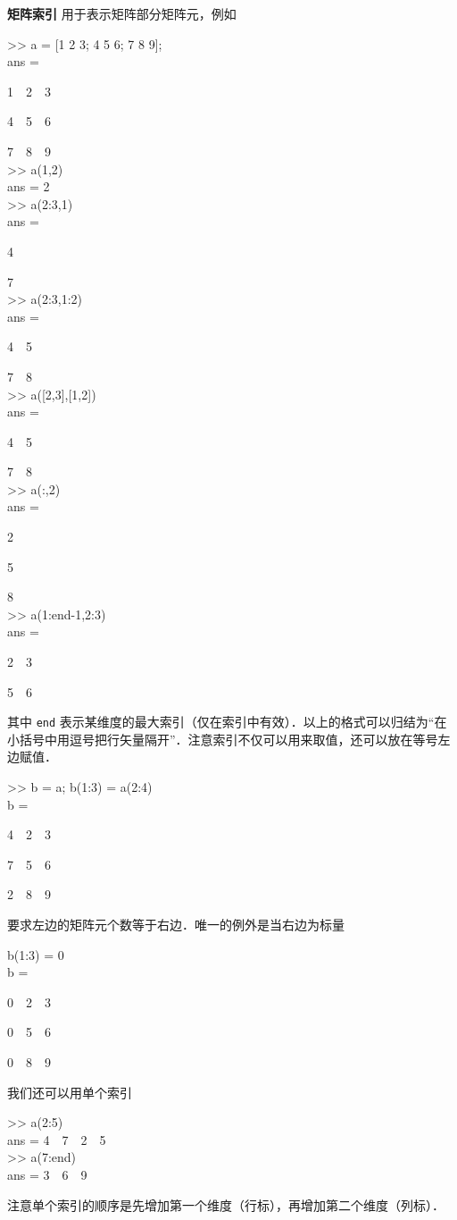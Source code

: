 \textbf{矩阵索引} 用于表示矩阵部分矩阵元，例如
\begin{Command}
>> a = [1 2 3; 4 5 6; 7 8 9]; \\
ans = \par
1\ \ 2\ \ 3 \par
4\ \ 5\ \ 6 \par
7\ \ 8\ \ 9 \\
>> a(1,2) \\
ans = 2 \\
>> a(2:3,1) \\
ans = \par
4 \par
7 \\
>> a(2:3,1:2) \\
ans = \par
4\ \ 5 \par
7\ \ 8 \\
>> a([2,3],[1,2]) \\
ans = \par
4\ \ 5 \par
7\ \ 8 \\
>> a(:,2) \\
ans = \par
2 \par
5 \par
8 \\
>> a(1:end-1,2:3) \\
ans = \par
2\ \ 3 \par
5\ \ 6
\end{Command}
其中 \texttt{end} 表示某维度的最大索引（仅在索引中有效）．以上的格式可以归结为“在小括号中用逗号把行矢量隔开”．注意索引不仅可以用来取值，还可以放在等号左边赋值．
\begin{Command}
>> b = a; b(1:3) = a(2:4) \\
b = \par
4\ \ 2\ \ 3 \par
7\ \ 5\ \ 6 \par
2\ \ 8\ \ 9
\end{Command}
要求左边的矩阵元个数等于右边．唯一的例外是当右边为标量
\begin{Command}
b(1:3) = 0 \\
b = \par
0\ \ 2\ \ 3 \par
0\ \ 5\ \ 6 \par
0\ \ 8\ \ 9 
\end{Command}
我们还可以用单个索引
\begin{Command}
>> a(2:5)\\
ans = 4\ \ 7\ \ 2\ \ 5 \\
>> a(7:end)\\
ans = 3\ \ 6\ \ 9
\end{Command}
注意单个索引的顺序是先增加第一个维度（行标），再增加第二个维度（列标）．

